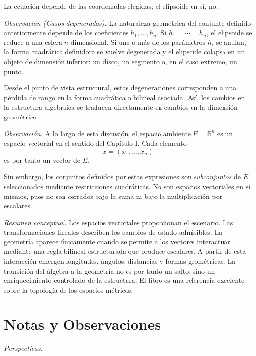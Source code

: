 La ecuación depende de las coordenadas elegidas; el elipsoide en sí, no.

\medskip

\emph{Observación (Casos degenerados).}
La naturaleza geométrica del conjunto definido anteriormente depende de los
coeficientes $h_1,\dots,h_n$.
Si $h_1=\cdots=h_n$, el elipsoide se reduce a una esfera $n$-dimensional.
Si uno o más de los parámetros $h_i$ se anulan, la forma cuadrática
definidora se vuelve degenerada y el elipsoide colapsa en un objeto de
dimensión inferior: un disco, un segmento o, en el caso extremo, un punto.

\medskip

Desde el punto de vista estructural, estas degeneraciones corresponden a una
pérdida de rango en la forma cuadrática o bilineal asociada.
Así, los cambios en la estructura algebraica se traducen directamente en
cambios en la dimensión geométrica.

\medskip

\emph{Observación.}
A lo largo de esta discusión, el espacio ambiente $E=\mathbb{R}^n$ es un
espacio vectorial en el sentido del Capítulo I.
Cada elemento
\[
x=(x_1,\dots,x_n)
\]
es por tanto un vector de $E$.

\medskip

Sin embargo, los conjuntos definidos por estas expresiones son \emph{subconjuntos}
de $E$ seleccionados mediante restricciones cuadráticas.
No son espacios vectoriales en sí mismos, pues no son cerrados bajo la suma
ni bajo la multiplicación por escalares.

\bigskip

\textit{Resumen conceptual.}
Los espacios vectoriales proporcionan el escenario.
Las transformaciones lineales describen los cambios de estado admisibles.
La geometría aparece únicamente cuando se permite a los vectores interactuar
mediante una regla bilineal estructurada que produce escalares.
A partir de esta interacción emergen longitudes, ángulos, distancias y formas
geométricas.
La transición del álgebra a la geometría no es por tanto un salto, sino un
enriquecimiento controlado de la estructura.
El libro \cite{iribarren2} es una referencia excelente sobre la topología de
los espacios métricos.

\section*{Notas y Observaciones}

\textit{Perspectivas.}

